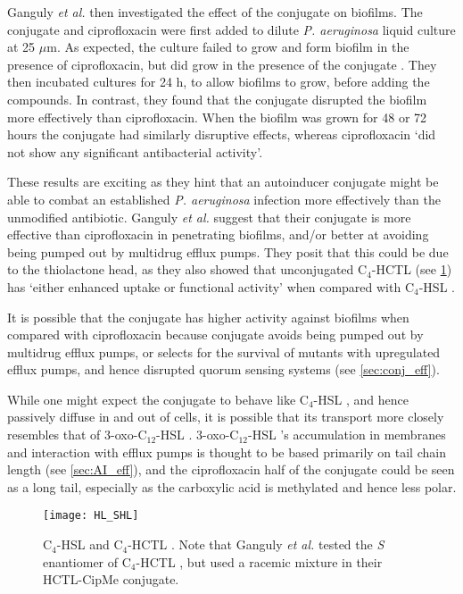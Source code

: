 Ganguly \textit{et al.} then investigated the effect of the conjugate on biofilms. 
The conjugate and ciprofloxacin were first added to dilute \textit{P. aeruginosa} liquid culture at 25 $\mu$m. 
As expected, the culture failed to grow and form biofilm in the presence of ciprofloxacin, but did grow in the presence of the conjugate . 
They then incubated cultures for 24 h, to allow biofilms to grow, before adding the compounds. In contrast, they found that the conjugate  disrupted the biofilm more effectively than ciprofloxacin. 
When the biofilm was grown for 48 or 72 hours the conjugate had similarly disruptive effects, whereas ciprofloxacin `did not show any significant antibacterial activity'.

These results are exciting as they hint that an autoinducer conjugate might be able to combat an established \textit{P. aeruginosa} infection more effectively than the unmodified antibiotic. 
Ganguly \textit{et al.} suggest that their conjugate is more effective than ciprofloxacin in penetrating biofilms, and/or better at avoiding being pumped out by multidrug efflux pumps. They posit that this could be due to the thiolactone head, as they also showed that unconjugated C$_4$-HCTL  (see \ref{fgr:HL_SHL}) has `either enhanced uptake or functional activity' when compared with C$_4$-HSL . 

It is possible that the conjugate  has higher activity against biofilms when compared with ciprofloxacin  because conjugate  avoids being pumped out by multidrug efflux pumps, or selects for the survival of mutants with upregulated efflux pumps, and hence disrupted quorum sensing systems (see \ref{sec:conj_eff}).

While one might expect the conjugate  to behave like C$_4$-HSL , and hence passively diffuse in and out of cells, it is possible that its transport more closely resembles that of 3-oxo-C$_{12}$-HSL . 3-oxo-C$_{12}$-HSL 's accumulation in membranes and interaction with efflux pumps is thought to be based primarily on tail chain length (see \ref{sec:AI_eff}), and the ciprofloxacin half of the conjugate  could be seen as a long tail, especially as the carboxylic acid is methylated and hence less polar.

\begin{figure}[H]
	\begin{center}
		\texttt{[image: HL\_SHL]}
		\caption{
		C$_4$-HSL  and C$_4$-HCTL . Note that Ganguly \textit{et al.} tested the \textit{S} enantiomer of C$_4$-HCTL , but used a racemic mixture in their HCTL-CipMe conjugate. %
		\label{fgr:HL_SHL}}
	\end{center}
\end{figure}

